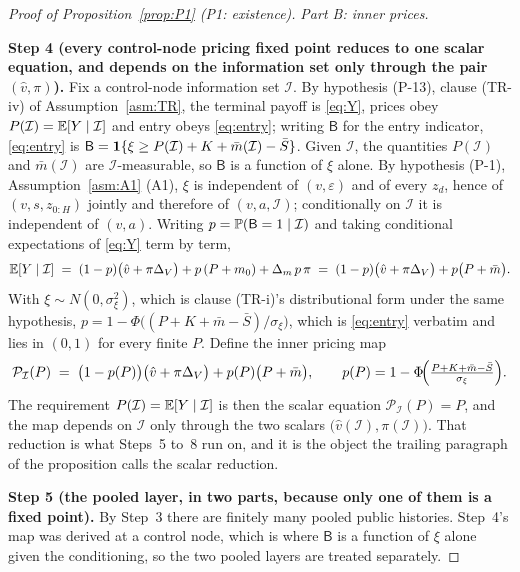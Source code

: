 \begin{proof}[Proof of Proposition~\ref{prop:P1} (P1: existence)]
\medskip
\noindent\emph{Part B: inner prices.}

\smallskip
\noindent\textbf{Step 4 (every control-node pricing fixed point reduces to one scalar equation, and
depends on the information set only through the pair $(\hat v,\pi)$).}
Fix a control-node information set $\mathcal I$. By hypothesis (P-13), clause (TR-iv) of
Assumption~\ref{asm:TR}, the terminal payoff is \eqref{eq:Y}, prices obey $P(\mathcal I) =
\mathbb{E}[Y \mid \mathcal I]$ and entry obeys \eqref{eq:entry}; writing $\mathsf B$ for the entry
indicator, \eqref{eq:entry} is $\mathsf B = \mathbf{1}\{\xi \ge P(\mathcal I)+K+\bar m(\mathcal I)-\bar
S\}$. Given $\mathcal I$, the quantities $P(\mathcal I)$ and $\bar m(\mathcal I)$ are
$\mathcal I$-measurable, so $\mathsf B$ is a function of $\xi$ alone. By hypothesis (P-1),
Assumption~\ref{asm:A1} (A1), $\xi$ is independent of $(v,\varepsilon)$ and of every $z_d$, hence of
$(v,s,z_{0:H})$ jointly and therefore of $(v,a,\mathcal I)$; conditionally on $\mathcal I$ it is
independent of $(v,a)$. Writing $p = \mathbb{P}(\mathsf B = 1 \mid \mathcal I)$ and taking conditional
expectations of \eqref{eq:Y} term by term,
\begin{equation}
\label{eq:P1-EY}
\mathbb{E}[Y \mid \mathcal I]
\;=\; (1-p)\bigl(\hat v + \pi\Delta_V\bigr) + p\,(P+m_0) + \Delta_m\,p\,\pi
\;=\; (1-p)\bigl(\hat v + \pi\Delta_V\bigr) + p\bigl(P + \bar m\bigr).
\end{equation}
With $\xi \sim N(0,\sigma_\xi^2)$, which is clause (TR-i)'s distributional form under the same
hypothesis, $p = 1-\Phi\bigl((P+K+\bar m-\bar S)/\sigma_\xi\bigr)$, which is \eqref{eq:entry}
verbatim and lies in $(0,1)$ for every finite $P$. Define the inner pricing map
\begin{equation}
\label{eq:P1-inner}
\mathcal P_{\mathcal I}(P) \;=\; \bigl(1-p(P)\bigr)\bigl(\hat v + \pi\Delta_V\bigr)
+ p(P)\bigl(P+\bar m\bigr),
\qquad
p(P) = 1-\Phi\!\Bigl(\tfrac{P+K+\bar m-\bar S}{\sigma_\xi}\Bigr).
\end{equation}
The requirement $P(\mathcal I) = \mathbb{E}[Y \mid \mathcal I]$ is then the scalar equation
$\mathcal P_{\mathcal I}(P) = P$, and the map depends on $\mathcal I$ only through the two scalars
$\bigl(\hat v(\mathcal I),\pi(\mathcal I)\bigr)$. That reduction is what Steps~5 to~8 run on, and it
is the object the trailing paragraph of the proposition calls the scalar reduction.

\smallskip
\noindent\textbf{Step 5 (the pooled layer, in two parts, because only one of them is a fixed point).}
By Step~3 there are finitely many pooled public histories. Step~4's map was derived at a control
node, which is where $\mathsf B$ is a function of $\xi$ alone given the conditioning, so the two
pooled layers are treated separately.


\end{proof}

